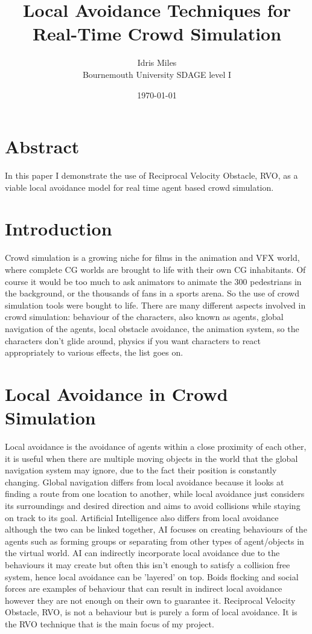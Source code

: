 \documentclass[a4paper,twocolumn]{article}
\author{Idris Miles\\
Bournemouth University SDAGE level I}
\title{Local Avoidance Techniques for Real-Time Crowd Simulation}
\date{\today}
\begin{document}
\maketitle

\section*{Abstract}
In this paper I demonstrate the use of Reciprocal Velocity Obstacle, RVO, as a viable local avoidance model for real time agent based crowd simulation. \\

\section{Introduction}
Crowd simulation is a growing niche for films in the animation and VFX world, where complete CG worlds are brought to life with their own CG inhabitants. Of course it would be too much to ask animators to animate the 300 pedestrians in the background, or the thousands of fans in a sports arena. So the use of crowd simulation tools were bought to life. There are many different aspects involved in crowd simulation: behaviour of the characters, also known as agents, global navigation of the agents, local obstacle avoidance, the animation system, so the characters don't glide around, physics if you want characters to react appropriately to various effects, the list goes on.

\section{Local Avoidance in Crowd Simulation}
Local avoidance is the avoidance of agents within a close proximity of each other, it is useful when there are multiple moving objects in the world that the global navigation system may ignore, due to the fact their position is constantly changing. Global navigation differs from local avoidance because it looks at finding a route from one location to another, while local avoidance just considers its surroundings and desired direction and aims to avoid collisions while staying on track to its goal. Artificial Intelligence also differs from local avoidance although the two can be linked together, AI focuses on creating behaviours of the agents such as forming groups or separating from other types of agent/objects in the virtual world. AI can indirectly incorporate local avoidance due to the behaviours it may create but often this isn't enough to satisfy a collision free system, hence local avoidance can be 'layered' on top. Boids flocking and social forces are examples of behaviour that can result in indirect local avoidance however they are not enough on their own to guarantee it. Reciprocal Velocity Obstacle, RVO, is not a behaviour but is purely a form of local avoidance. It is the RVO technique that is the main focus of my project.
\end{document}
